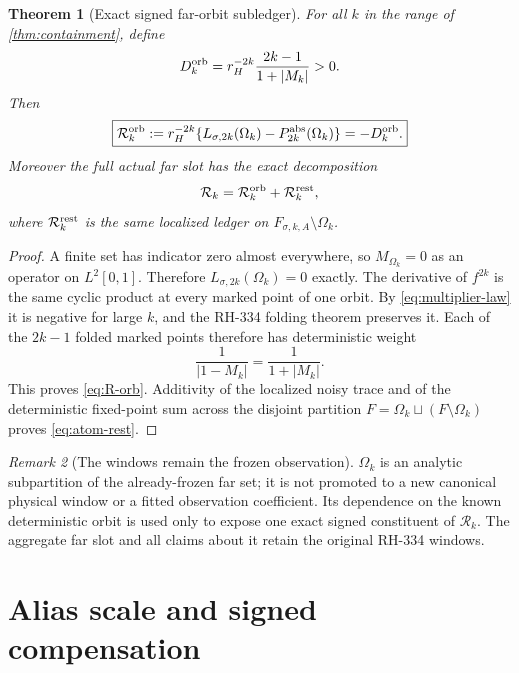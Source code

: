 \documentclass[11pt]{article}
\newtheorem{theorem}{Theorem}[section]
\theoremstyle{remark}
\newtheorem{remark}[theorem]{Remark}
\newcommand{\cR}{\mathcal R}
\begin{document}
\begin{theorem}[Exact signed far-orbit subledger]
\label{thm:far-atom}
For all $k$ in the range of \cref{thm:containment}, define
\begin{equation}\label{eq:D-orb}
 D_k^{\rm orb}
 =r_H^{-2k}\frac{2k-1}{1+|M_k|}>0.
\end{equation}
Then
\begin{equation}\label{eq:R-orb}
 \boxed{
 \cR_k^{\rm orb}:=r_H^{-2k}
 \{L_{\sigma,2k}(\Omega_k)-P_{2k}^{\rm abs}(\Omega_k)\}
 =-D_k^{\rm orb}.}
\end{equation}
Moreover the full actual far slot has the exact decomposition
\begin{equation}\label{eq:atom-rest}
 \cR_k=\cR_k^{\rm orb}+\cR_k^{\rm rest},
\end{equation}
where $\cR_k^{\rm rest}$ is the same localized ledger on
$F_{\sigma,k,A}\setminus\Omega_k$.
\end{theorem}

\begin{proof}
A finite set has indicator zero almost everywhere, so $M_{\Omega_k}=0$ as
an operator on $L^2[0,1]$.  Therefore
$L_{\sigma,2k}(\Omega_k)=0$ exactly.  The derivative of $f^{2k}$ is the same
cyclic product at every marked point of one orbit.  By
\eqref{eq:multiplier-law} it is negative for large $k$, and the RH-334
folding theorem preserves it.  Each of the $2k-1$ folded marked points
therefore has deterministic weight
\begin{equation*}
 \frac1{|1-M_k|}=\frac1{1+|M_k|}.
\end{equation*}
This proves \eqref{eq:R-orb}.  Additivity of the localized noisy trace and of
the deterministic fixed-point sum across the disjoint partition
$F=\Omega_k\sqcup(F\setminus\Omega_k)$ proves \eqref{eq:atom-rest}.
\end{proof}

\begin{remark}[The windows remain the frozen observation]
$\Omega_k$ is an analytic subpartition of the already-frozen far set; it is
not promoted to a new canonical physical window or a fitted observation
coefficient.  Its dependence on the known deterministic orbit is used only
to expose one exact signed constituent of $\cR_k$.  The aggregate far slot
and all claims about it retain the original RH-334 windows.
\end{remark}

\section{Alias scale and signed compensation}
\end{document}
